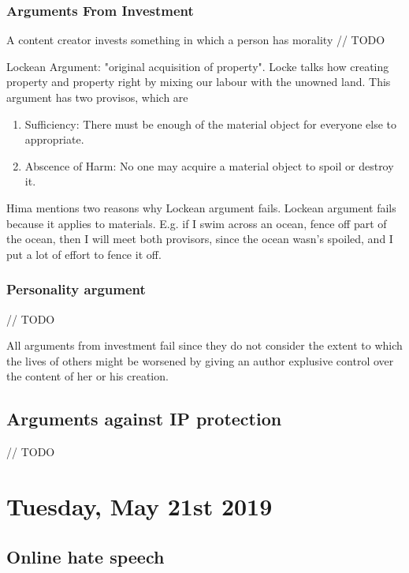 \documentclass{article}
\begin{document}
\subsubsection*{Arguments From Investment}

A content creator invests something in which a person has morality // TODO

Lockean Argument: "original acquisition of property". Locke talks how creating property and property right by mixing our labour with the unowned land. This argument has two provisos, which are

\begin{enumerate}
    \item Sufficiency: There must be enough of the material object for everyone else to appropriate.
    \item Abscence of Harm: No one may acquire a material object to spoil or destroy it.
\end{enumerate}

Hima mentions two reasons why Lockean argument fails. Lockean argument fails because it applies to materials. E.g. if I swim across an ocean, fence off part of the ocean, then I will meet both provisors, since the ocean wasn's spoiled, and I put a lot of effort to fence it off.

\subsubsection*{Personality argument}

// TODO

All arguments from investment fail since they do not consider the extent to which the lives of others might be worsened by giving an author explusive control over the content of her or his creation.

\subsection{Arguments against IP protection}

// TODO

\section{Tuesday, May 21st 2019}

\subsection{Online hate speech}
\end{document}
